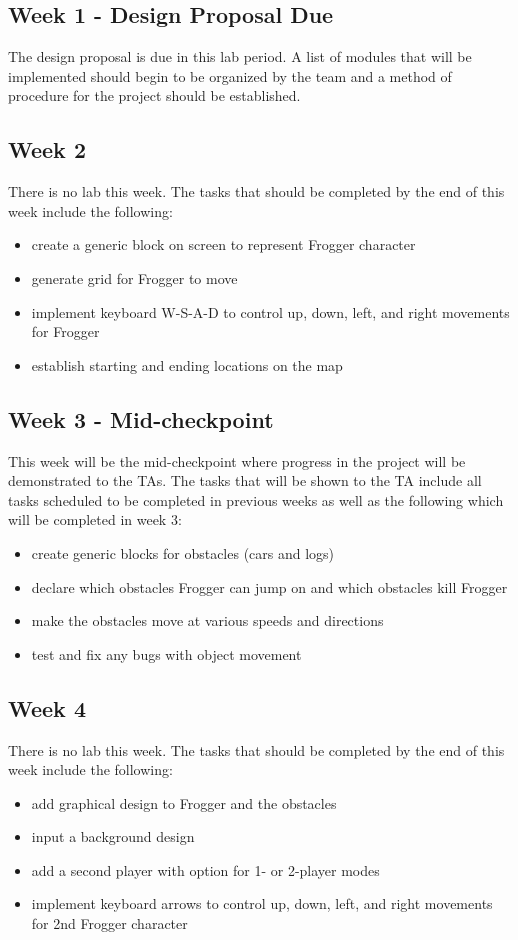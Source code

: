 \documentclass[journal, twocolumn, final,11pt,letterpaper]{IEEEtran}
\begin{document}
\subsection{Week 1 - Design Proposal Due} 
The design proposal is due in this lab period.  A list of modules that will be implemented should begin to be organized by the team and a method of procedure for the project should be established.  
\subsection{Week 2}
There is no lab this week.  The tasks that should be completed by the end of this week include the following:

\begin{itemize}
	\item create a generic block on screen to represent Frogger character
	\item generate grid for Frogger to move
	\item implement keyboard W-S-A-D to control up, down, left, and right movements for Frogger 
	\item establish starting and ending locations on the map 
\end{itemize}

\subsection{Week 3 - Mid-checkpoint}
This week will be the mid-checkpoint where progress in the project will be demonstrated to the TAs.  The tasks that will be shown to the TA include all tasks scheduled to be completed in previous weeks as well as the following which will be completed in week 3: 
\begin{itemize}
	\item create generic blocks for obstacles (cars and logs) 
	\item declare which obstacles Frogger can jump on and which obstacles kill Frogger
	\item make the obstacles move at various speeds and directions
	\item test and fix any bugs with object movement
\end{itemize}

\subsection{Week 4} 
There is no lab this week. The tasks that should be completed by the end of this week include the following: 
\begin{itemize}
	\item add graphical design to Frogger and the obstacles
	\item input a background design
	\item add a second player with option for 1- or 2-player modes
	\item implement keyboard arrows to control up, down, left, and right movements for 2nd Frogger character

\end{itemize}
\end{document}
